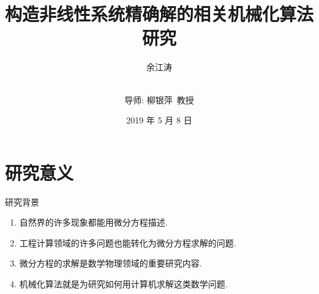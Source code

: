 \documentclass[handout]{beamer}
\title[华东师范大学硕士学位论文]{构造非线性系统精确解的相关机械化算法研究}
\author[余江涛]{余江涛 \and \\导师: 柳银萍~教授}
\date{2019 年 5 月 8 日}
\begin{document}

\section{研究意义}
\begin{frame}{研究背景}
\begin{enumerate}
\item 自然界的许多现象都能用微分方程描述.
\item 工程计算领域的许多问题也能转化为微分方程求解的问题.
\item 微分方程的求解是数学物理领域的重要研究内容.
\item 机械化算法就是为研究如何用计算机求解这类数学问题. 
\end{enumerate}
\end{frame}
\end{document}
